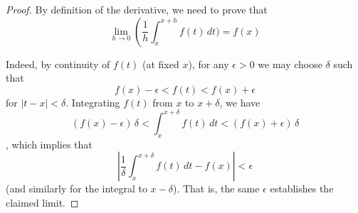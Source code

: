 

\begin{proof}
By definition of the derivative, we need to prove that 
$$
\lim_{h\to 0} \left(\frac{1}{h}\int_x^{x+h} f(t)\,dt) = f(x)
$$

Indeed, by continuity of $f(t)$ (at fixed $x$), for 
any $\epsilon>0$ we may choose $\delta$ such that
$$
f(x)-\epsilon<f(t)<f(x)+\epsilon
$$
for $|t-x|<\delta$. Integrating $f(t)$ from $x$ to $x+\delta$, we have
$$
(f(x)-\epsilon)\, \delta < \int_x^{x+\delta} f(t)\,dt < (f(x)+\epsilon)\, \delta
$$
, which implies that
$$
\left| \frac{1}{\delta}\int_x^{x+\delta} f(t)\,dt - f(x) \right| < \epsilon
$$
(and similarly for the integral to $x-\delta$). That is, the same $\epsilon$ establishes 
the claimed limit.

\end{proof}

